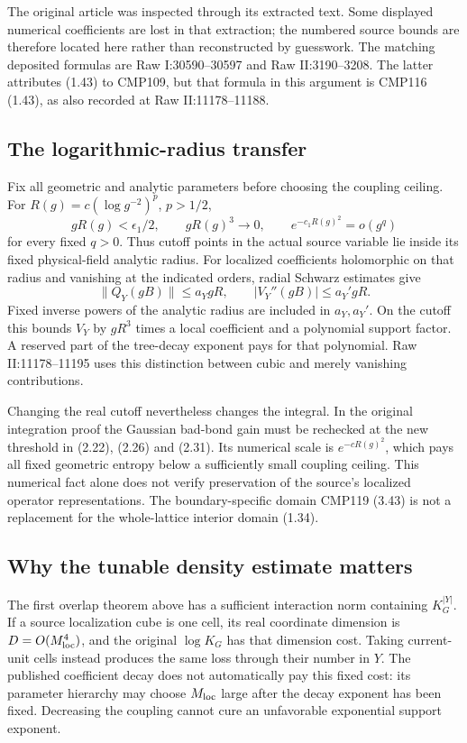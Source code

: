 \documentclass[11pt]{article}
\theoremstyle{remark}
\begin{document}
The original article was inspected through its extracted text.
Some displayed numerical coefficients are lost in that extraction;
the numbered source bounds are therefore located here rather than
reconstructed by guesswork. The matching deposited formulas are
Raw I:30590--30597 and Raw II:3190--3208. The latter attributes
(1.43) to CMP109, but that formula in this argument is CMP116
(1.43), as also recorded at Raw II:11178--11188.

\subsection{The logarithmic-radius transfer}

Fix all geometric and analytic parameters before choosing the
coupling ceiling. For $R(g)=c(\log g^{-2})^p$, $p>1/2$,
\[
 gR(g)<\epsilon_1/2,
 \qquad gR(g)^3\longrightarrow0,
 \qquad e^{-c_1R(g)^2}=o(g^q)
\]
for every fixed $q>0$. Thus cutoff points in the actual source
variable lie inside its fixed physical-field analytic radius.
For localized coefficients holomorphic on that radius and
vanishing at the indicated orders, radial Schwarz estimates give
\[
 \|Q_Y(gB)\|\le a_Y gR,
 \qquad |V_Y''(gB)|\le a_Y' gR.
\]
Fixed inverse powers of the analytic radius are included in
$a_Y,a_Y'$. On the cutoff this bounds $V_Y$ by $gR^3$ times
a local coefficient and a polynomial support factor. A reserved
part of the tree-decay exponent pays for that polynomial.
Raw II:11178--11195 uses this distinction between cubic and
merely vanishing contributions.

Changing the real cutoff nevertheless changes the integral.
In the original integration proof the Gaussian bad-bond gain
must be rechecked at the new threshold in (2.22), (2.26) and
(2.31). Its numerical scale is $e^{-cR(g)^2}$, which pays all
fixed geometric entropy below a sufficiently small coupling
ceiling. This numerical fact alone does not verify preservation
of the source's localized operator representations. The
boundary-specific domain CMP119 (3.43) is not a replacement
for the whole-lattice interior domain (1.34).

\subsection{Why the tunable density estimate matters}

The first overlap theorem above has a sufficient interaction norm
containing $K_G^{|Y|}$. If a source localization cube is one cell,
its real coordinate dimension is $D=O(M_{\rm loc}^4)$, and the
original $\log K_G$ has that dimension cost. Taking current-unit
cells instead produces the same loss through their number in
$Y$. The published coefficient decay does not automatically pay
this fixed cost: its parameter hierarchy may choose $M_{\rm loc}$
large after the decay exponent has been fixed. Decreasing the
coupling cannot cure an unfavorable exponential support exponent.
\end{document}
